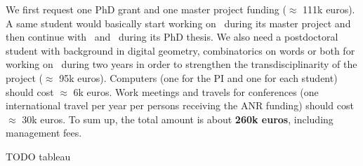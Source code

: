 We first request one PhD grant and one master project funding ($\approx$ 111k euros). A same student would basically start working on \wpPPA~during its master project and then continue with \wpEstim~and \wpScale~during its PhD thesis. We also need a postdoctoral student with background in digital geometry, combinatorics on words or both for working on \wpPattern~during two years in order to strengthen the transdisciplinarity of the project ($\approx$ 95k euros). 
Computers (one for the PI and one for each student) should cost $\approx$ 6k euros. Work meetings and travels for conferences (one international travel per year per persons receiving the ANR funding) should cost $\approx$ 30k euros. 
To sum up, the total amount is about \textbf{260k euros}, including management fees. 

TODO tableau

